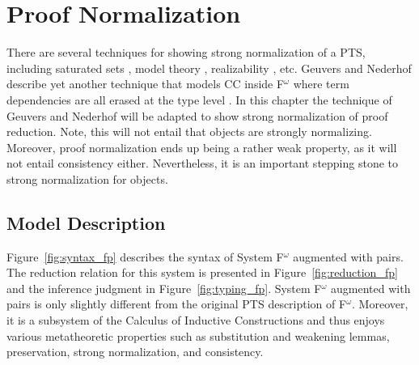 \chapter{Proof Normalization}
\label{chap:3}


There are several techniques for showing strong normalization of a PTS, including saturated sets \cite{geuvers1994_sn_satset}, model theory \cite{terlouw1995_sn}, realizability \cite{ong1993}, etc.
Geuvers and Nederhof describe yet another technique that models CC inside F$^\omega$ where term dependencies are all erased at the type level \cite{geuvers1991_sn_tof}.
In this chapter the technique of Geuvers and Nederhof will be adapted to show strong normalization of proof reduction.
Note, this will not entail that objects are strongly normalizing.
Moreover, proof normalization ends up being a rather weak property, as it will not entail consistency either.
Nevertheless, it is an important stepping stone to strong normalization for objects.

\section{Model Description}

Figure~\ref{fig:syntax_fp} describes the syntax of System F$^\omega$ augmented with pairs.
The reduction relation for this system is presented in Figure~\ref{fig:reduction_fp} and the inference judgment in Figure~\ref{fig:typing_fp}.
System F$^\omega$ augmented with pairs is only slightly different from the original PTS description of F$^\omega$.
Moreover, it is a subsystem of the Calculus of Inductive Constructions and thus enjoys various metatheoretic properties such as substitution and weakening lemmas, preservation, strong normalization, and consistency.





